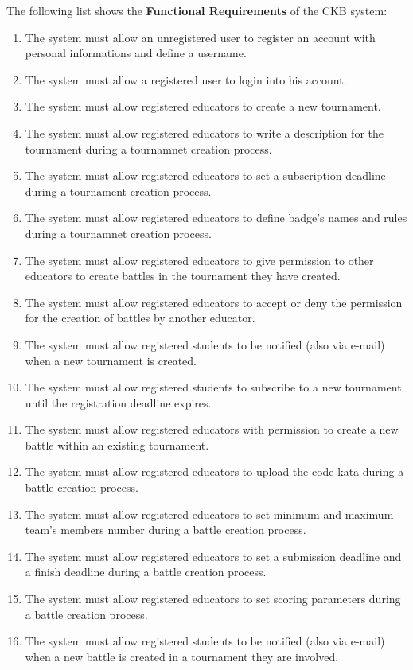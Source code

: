 \documentclass[a4paper, 11pt, titlepage]{article}
\begin{document}
The following list shows the \textbf{Functional Requirements} of the CKB system:
\begin{enumerate}[font={\bfseries}, label={R\arabic* :}]
    \item The system must allow an unregistered user to register an account with personal informations and define a username.
    \item The system must allow a registered user to login into his account.
    \item The system must allow registered educators to create a new tournament.
    \item The system must allow registered educators to write a description for the tournament during a tournamnet creation process.
    \item The system must allow registered educators to set a subscription deadline during a tournament creation process. 
    \item The system must allow registered educators to define badge's names and rules during a tournamnet creation process.
    \item The system must allow registered educators to give permission to other educators to create battles in the tournament they have created.
    \item The system must allow registered educators to accept or deny the permission for the creation of battles by another educator.
    \item The system must allow registered students to be notified (also via e-mail) when a new tournament is created.
    \item The system must allow registered students to subscribe to a new tournament until the registration deadline expires.
    \item The system must allow registered educators with permission to create a new battle within an existing tournament.
    \item The system must allow registered educators to upload the code kata during a battle creation process.
    \item The system must allow registered educators to set minimum and maximum team's members number during a battle creation process.
    \item The system must allow registered educators to set a submission deadline and a finish deadline during a battle creation process.
    \item The system must allow registered educators to set scoring parameters during a battle creation process.
    \item The system must allow registered students to be notified (also via e-mail) when a new battle is created in a tournament they are involved.

\end{enumerate}
\end{document}
